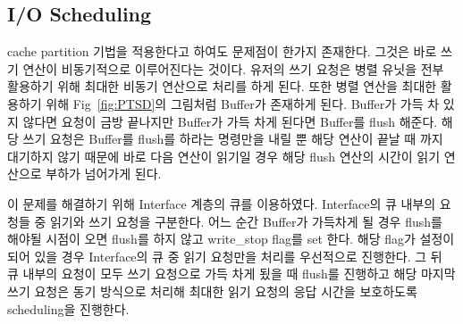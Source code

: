 \documentclass[conference]{IEEEtran}
\begin{document}
\subsection{I/O Scheduling}
cache partition 기법을 적용한다고 하여도 문제점이 한가지 존재한다. 그것은 바로 쓰기 연산이
비동기적으로 이루어진다는 것이다. 유저의 쓰기 요청은 병렬 유닛을 전부 활용하기 위해 최대한 
비동기 연산으로 처리를 하게 된다. 또한 병렬 연산을 최대한 활용하기 위해 Fig~\ref{fig:PTSD}의
그림처럼 Buffer가 존재하게 된다. Buffer가 가득 차 있지 않다면 요청이 금방 끝나지만 Buffer가
가득 차게 된다면 Buffer를 flush 해준다. 해당 쓰기 요청은 Buffer를 flush를 하라는 명령만을 내릴 
뿐 해당 연산이 끝날 때 까지 대기하지 않기 때문에 바로 다음 연산이 읽기일 경우 해당 flush 연산의
시간이 읽기 연산으로 부하가 넘어가게 된다.\par

이 문제를 해결하기 위해 Interface 계층의 큐를 이용하였다. Interface의 큐 내부의 요청들 중 
읽기와 쓰기 요청을 구분한다. 어느 순간 Buffer가 가득차게 될 경우 flush를 해야될 시점이 오면 
flush를 하지 않고 write\_stop flag를 set 한다. 해당 flag가 설정이 되어 있을 경우 Interface의 
큐 중 읽기 요청만을 처리를 우선적으로 진행한다. 그 뒤 큐 내부의 요청이 모두 쓰기 요청으로 
가득 차게 됬을 때 flush를 진행하고 해당 마지막 쓰기 요청은 동기 방식으로 처리해 최대한 읽기 
요청의 응답 시간을 보호하도록 scheduling을 진행한다.\par
\end{document}
